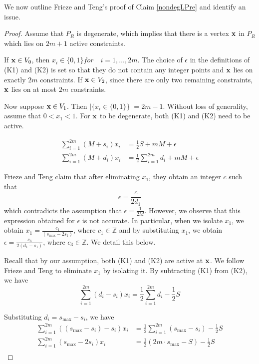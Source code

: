 \documentclass[3p, twocolumn]{elsarticle}
\def\ve#1{\mathchoice{\mbox{\boldmath$\displaystyle\bf#1$}}
{\mbox{\boldmath$\textstyle\bf#1$}}
{\mbox{\boldmath$\scriptstyle\bf#1$}}
{\mbox{\boldmath$\scriptscriptstyle\bf#1$}}}
\begin{document}
We now outline Frieze and Teng's proof of Claim \ref{nondegLPre} and identify an issue.
\begin{proof}
Assume that $P_R$ is degenerate, which implies that there is a vertex $\ve{x}$ in $P_R$ which lies on $2m+1$ active constraints.  

If $\ve{x} \in V_0$, then $x_i \in \{0,1\} for \quad i=1,\ldots, 2m$.  The choice of $\epsilon$ in the definitions of (K1) and (K2) is set so that they do not contain any integer points and $\ve{x}$ lies on exactly $2m$ constraints.
If $\ve{x} \in V_2$, since there are only two remaining constraints, $\ve{x}$ lies on at most $2m$ constraints.


Now suppose $\ve{x} \in V_1$.  Then $|\{x_i \in \{0,1\}\}| = 2m-1$. Without loss of generality, assume that $0< x_1<1 $. For $\ve{x}$ to be degenerate, both (K1) and (K2) need to be active. 

\begin{align*}
    \sum_{i=1}^{2m} (M + s_i) x_i &= \frac{1}{2}S + mM + \epsilon \tag{K1}\\ 
\sum_{i=1}^{2m} (M + d_i)x_i &= \frac{1}{2} \sum_{i=1}^{2m} d_i + mM + \epsilon \tag{K2}
\end{align*}

Frieze and Teng claim that after eliminating $x_1$, they obtain an integer $c$ such that $$\epsilon = \frac{c}{2d_1}$$ which contradicts the assumption that $\epsilon = \frac{1}{2M}$. However, we observe that this expression obtained for $\epsilon$ is not accurate. In particular, when we isolate $x_1$, we obtain $x_1 = \frac{c_1}{(s_{\max}-2s_1)}$, where $c_1 \in \mathbb{Z}$ and by substituting $x_1$, we obtain $\epsilon = \frac{c_3}{2(d_1 - s_1)}$, where $c_3 \in \mathbb{Z}$. We detail this below. 

Recall that by our assumption, both (K1) and (K2) are active at $\ve{x}$. We follow Frieze and Teng to eliminate $x_1$ by isolating it. By subtracting (K1) from (K2), we have 
$$\sum_{i=1}^{2m} (d_i - s_i)x_i = \frac{1}{2}\sum_{i=1}^{2m} d_i - \frac{1}{2}S$$

Substituting $d_i = s_{\max} - s_i$, we have
\begin{align*}
\sum_{i=1}^{2m} ((s_{\max} - s_i) - s_i)x_i &= \frac{1}{2}\sum_{i=1}^{2m} (s_{\max} - s_i) - \frac{1}{2}S \\
\sum_{i=1}^{2m} (s_{\max} - 2s_i)x_i &= \frac{1}{2}\left(2m\cdot s_{\max} - S\right) - \frac{1}{2}S \\
\end{align*}


\end{proof}
\end{document}
